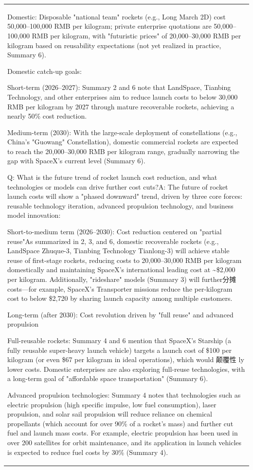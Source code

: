 \begin{longtable}[]{@{}
  >{\raggedright\arraybackslash}p{}@{}}
Domestic: Disposable "national team" rockets (e.g., Long March 2D) cost
50,000--100,000 RMB per kilogram; private enterprise quotations are
50,000--100,000 RMB per kilogram, with "futuristic prices" of
20,000--30,000 RMB per kilogram based on reusability expectations (not
yet realized in practice, Summary 6).

Domestic catch-up goals:

Short-term (2026--2027): Summary 2 and 6 note that LandSpace, Tianbing
Technology, and other enterprises aim to reduce launch costs to below
30,000 RMB per kilogram by 2027 through mature recoverable rockets,
achieving a nearly 50\% cost reduction.

Medium-term (2030): With the large-scale deployment of constellations
(e.g., China's "Guowang" Constellation), domestic commercial rockets are
expected to reach the 20,000--30,000 RMB per kilogram range, gradually
narrowing the gap with SpaceX's current level (Summary 6).

Q: What is the future trend of rocket launch cost reduction, and what
technologies or models can drive further cost cuts?A: The future of
rocket launch costs will show a "phased downward" trend, driven by three
core forces: reusable technology iteration, advanced propulsion
technology, and business model innovation:

Short-to-medium term (2026--2030): Cost reduction centered on "partial
reuse"As summarized in 2, 3, and 6, domestic recoverable rockets (e.g.,
LandSpace Zhuque-3, Tianbing Technology Tianlong-3) will achieve stable
reuse of first-stage rockets, reducing costs to 20,000--30,000 RMB per
kilogram domestically and maintaining SpaceX's international leading
cost at \textasciitilde\$2,000 per kilogram. Additionally, "rideshare"
models (Summary 3) will further分摊 costs---for example, SpaceX's
Transporter missions reduce the per-kilogram cost to below \$2,720 by
sharing launch capacity among multiple customers.

Long-term (after 2030): Cost revolution driven by "full reuse" and
advanced propulsion

Full-reusable rockets: Summary 4 and 6 mention that SpaceX's Starship (a
fully reusable super-heavy launch vehicle) targets a launch cost of
\$100 per kilogram (or even \$67 per kilogram in ideal operations),
which would 颠覆性 ly lower costs. Domestic enterprises are also
exploring full-reuse technologies, with a long-term goal of "affordable
space transportation" (Summary 6).

Advanced propulsion technologies: Summary 4 notes that technologies such
as electric propulsion (high specific impulse, low fuel consumption),
laser propulsion, and solar sail propulsion will reduce reliance on
chemical propellants (which account for over 90\% of a rocket's mass)
and further cut fuel and launch mass costs. For example, electric
propulsion has been used in over 200 satellites for orbit maintenance,
and its application in launch vehicles is expected to reduce fuel costs
by 30\% (Summary 4).


\end{longtable}

